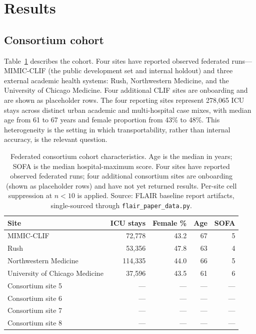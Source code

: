 \documentclass[12pt]{article}
\begin{document}
\section{Results}
\label{sec:results}

\subsection*{Consortium cohort}

Table~\ref{tab:consortium} describes the cohort. Four sites have reported observed federated runs---MIMIC-CLIF (the public development set and internal holdout) and three external academic health systems: Rush, Northwestern Medicine, and the University of Chicago Medicine. Four additional CLIF sites are onboarding and are shown as placeholder rows. The four reporting sites represent 278{,}065 ICU stays across distinct urban academic and multi-hospital case mixes, with median age from 61 to 67 years and female proportion from 43\% to 48\%. This heterogeneity is the setting in which transportability, rather than internal accuracy, is the relevant question.

\begin{table}[t]
\centering
\footnotesize
\setlength{\tabcolsep}{5pt}
\begin{tabular}{lrrrr}
\toprule
\textbf{Site} & \textbf{ICU stays} & \textbf{Female \%} & \textbf{Age} & \textbf{SOFA} \\
\midrule
MIMIC-CLIF & 72{,}778 & 43.2 & 67 & 5 \\
Rush & 53{,}356 & 47.8 & 63 & 4 \\
Northwestern Medicine & 114{,}335 & 44.0 & 66 & 5 \\
University of Chicago Medicine & 37{,}596 & 43.5 & 61 & 6 \\
Consortium site 5 & --- & --- & --- & --- \\
Consortium site 6 & --- & --- & --- & --- \\
Consortium site 7 & --- & --- & --- & --- \\
Consortium site 8 & --- & --- & --- & --- \\
\bottomrule
\end{tabular}
\caption{Federated consortium cohort characteristics. Age is the median in years; SOFA is the median hospital-maximum score. Four sites have reported observed federated runs; four additional consortium sites are onboarding (shown as placeholder rows) and have not yet returned results. Per-site cell suppression at $n<10$ is applied. Source: FLAIR baseline report artifacts, single-sourced through \texttt{flair\_paper\_data.py}.}
\label{tab:consortium}
\end{table}
\end{document}

